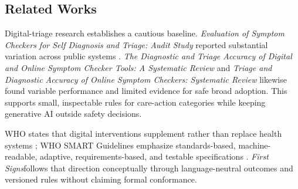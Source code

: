 \documentclass[12pt,onecolumn]{IEEEtran}
\newcommand{\product}{\textit{First Signs}}
\begin{document}
\subsection{Related Works}
Digital-triage research establishes a cautious baseline. \emph{Evaluation of Symptom Checkers for Self Diagnosis and Triage: Audit Study} reported substantial variation across public systems \cite{semigran2015symptom}. \emph{The Diagnostic and Triage Accuracy of Digital and Online Symptom Checker Tools: A Systematic Review} \cite{wallace2022accuracy} and \emph{Triage and Diagnostic Accuracy of Online Symptom Checkers: Systematic Review} \cite{riboli2023triage} likewise found variable performance and limited evidence for safe broad adoption. This supports small, inspectable rules for care-action categories while keeping generative AI outside safety decisions.

WHO states that digital interventions supplement rather than replace health systems \cite{who2019digital}; WHO SMART Guidelines emphasize standards-based, machine-readable, adaptive, requirements-based, and testable specifications \cite{whoSmart}. \product follows that direction conceptually through language-neutral outcomes and versioned rules without claiming formal conformance.
\end{document}
